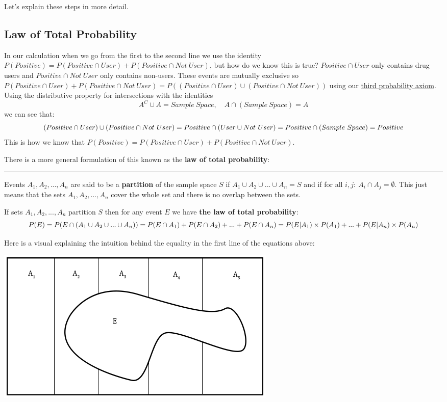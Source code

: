 \documentclass[
]{book}
\theoremstyle{definition}
\theoremstyle{definition}
\theoremstyle{definition}
\theoremstyle{remark}
\begin{document}
Let's explain these steps in more detail.

\hypertarget{law-of-total-probability}{%
\subsection{Law of Total Probability}\label{law-of-total-probability}}

In our calculation when we go from the first to the second line we use the identity \(P(Positive)=P(Positive \cap User)+P(Positive \cap Not \ User)\), but how do we know this is true?
\(Positive \cap User\) only contains drug users and \(Positive \cap Not \ User\) only contains non-users. These events are mutually exclusive so \(P(Positive \cap User)+P(Positive \cap Not \ User) = P((Positive \cap User) \cup (Positive \cap Not \ User))\) using our \protect\hyperlink{axiomsprob}{third probability axiom}. Using the distributive property for intersections with the identities
\[A^C \cup A = Sample \ Space, \quad A \cap (Sample \ Space) = A\]
we can see that:
\[(Positive \cap User) \cup (Positive \cap Not \ User) = Positive \cap (User \cup Not \ User) = \\ Positive \cap (Sample \ Space) = Positive\]
This is how we know that \(P(Positive)=P(Positive \cap User)+P(Positive \cap Not \ User)\).

There is a more general formulation of this known as the \textbf{law of total probability}:

\begin{center}\rule{0.5\linewidth}{0.5pt}\end{center}

Events \(A_1,A_2,...,A_n\) are said to be a \textbf{partition} of the sample space \(S\) if \(A_1 \cup A_2 \cup... \cup A_n=S\) and if for all \(i,j: \ A_i \cap A_j = \emptyset\). This just means that the sets \(A_1,A_2,...,A_n\) cover the whole set and there is no overlap between the sets.

If sets \(A_1,A_2,...,A_n\) partition \(S\) then for any event \(E\) we have \textbf{the law of total probability}:
\[P(E) = P(E \cap (A_1 \cup A_2 \cup ... \cup A_n)) = \\ P(E \cap A_1) + P(E \cap A_2) + ... + P(E \cap A_n) = \\ P(E|A_1) \times P(A_1) +...+ P(E|A_n) \times P(A_n)\]

Here is a visual explaining the intuition behind the equality in the first line of the equations above:

\includegraphics{Pictures/03-Probability/totalprob.PNG}
\end{document}
